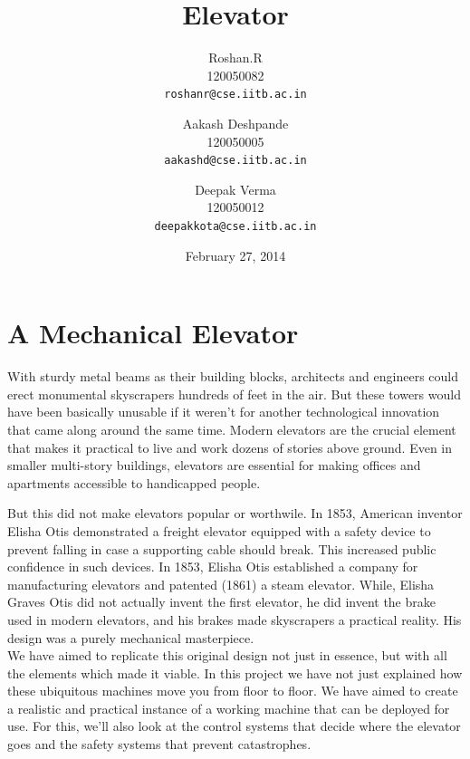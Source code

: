 \documentclass[a4paper,11pt]{article}
\begin{document}
\date{February 27, 2014}

\title{Elevator}

\author{Roshan.R\\
120050082\\
\texttt{roshanr@cse.iitb.ac.in}\\
\and Aakash Deshpande\\
120050005\\
\texttt{aakashd@cse.iitb.ac.in}\\
\and Deepak Verma\\
120050012\\
\texttt{deepakkota@cse.iitb.ac.in}}

\maketitle

\section{A Mechanical Elevator}

With sturdy metal beams as their building blocks, architects and engineers could erect monumental skyscrapers hundreds of feet in the air. But these towers would have been basically unusable if it weren't for another technological innovation that came along around the same time. Modern elevators are the crucial element that makes it practical to live and work dozens of stories above ground. Even in smaller multi-story buildings, elevators are essential for making offices and apartments accessible to handicapped people.

But this did not make elevators popular or worthwile. In 1853, American inventor Elisha Otis demonstrated a freight elevator equipped with a safety device to prevent falling in case a supporting cable should break. This increased public confidence in such devices. In 1853, Elisha Otis established a company for manufacturing elevators and patented (1861) a steam elevator. While, Elisha Graves Otis did not actually invent the first elevator, he did invent the brake used in modern elevators, and his brakes made skyscrapers a practical reality. His design was a purely mechanical masterpiece.\\

We have aimed to replicate this original design not just in essence, but with all the elements which made it viable.
In this project we have not just explained how these ubiquitous machines move you from floor to floor. We have aimed to create a realistic and practical instance of a working machine that can be deployed for use. For this, we'll also look at the control systems that decide where the elevator goes and the safety systems that prevent catastrophes.	
\end{document}
